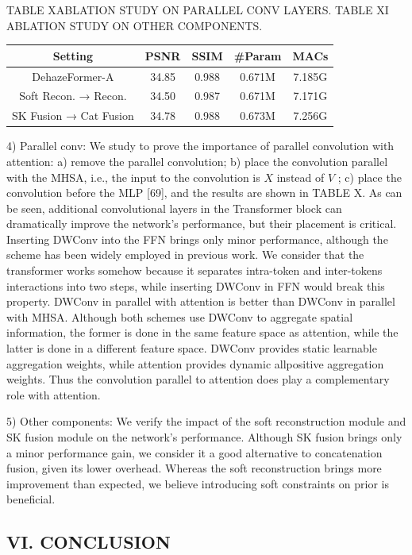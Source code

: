 TABLE XABLATION STUDY ON PARALLEL CONV LAYERS.
TABLE XI ABLATION STUDY ON OTHER COMPONENTS.


\begin{table}[htbp]
\centering
\begin{tabular}{|c|c|c|c|c|}\hline
Setting & PSNR & SSIM & #Param & MACs \\ \hline
DehazeFormer-A & 34.85 & 0.988 & 0.671M & 7.185G \\ \hline
Soft Recon. → Recon. & 34.50 & 0.987 & 0.671M & 7.171G \\ \hline
SK Fusion → Cat Fusion & 34.78 & 0.988 & 0.673M & 7.256G \\ \hline
\end{tabular}\end{table}

4) Parallel conv: We study to prove the importance of parallel convolution with attention: a) remove the parallel convolution; b) place the convolution parallel with the MHSA, i.e., the input to the convolution is $X$ instead of $V$ ; c) place the convolution before the MLP [69], and the results are shown in TABLE X. As can be seen, additional convolutional layers in the Transformer block can dramatically improve the network’s performance, but their placement is critical. Inserting DWConv into the FFN brings only minor performance, although the scheme has been widely employed in previous work. We consider that the transformer works somehow because it separates intra-token and inter-tokens interactions into two steps, while inserting DWConv in FFN would break this property. DWConv in parallel with attention is better than DWConv in parallel with MHSA. Although both schemes use DWConv to aggregate spatial information, the former is done in the same feature space as attention, while the latter is done in a different feature space. DWConv provides static learnable aggregation weights, while attention provides dynamic allpositive aggregation weights. Thus the convolution parallel to attention does play a complementary role with attention.

5) Other components: We verify the impact of the soft reconstruction module and SK fusion module on the network’s performance. Although SK fusion brings only a minor performance gain, we consider it a good alternative to concatenation fusion, given its lower overhead. Whereas the soft reconstruction brings more improvement than expected, we believe introducing soft constraints on prior is beneficial.

\subsection{VI. CONCLUSION}

